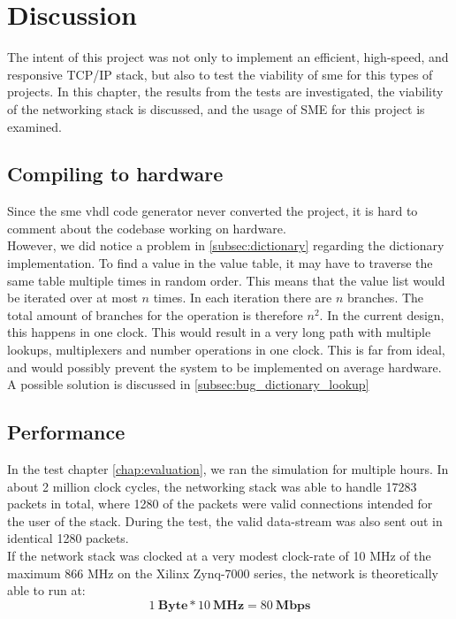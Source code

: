 \chapter{Discussion}
\label{chap:discussion}
The intent of this project was not only to implement an efficient, high-speed,
and responsive TCP/IP stack, but also to test the viability of \gls{sme} for
this types of projects. In this chapter, the results from the tests are
investigated, the viability of the networking stack is discussed, and the usage
of SME for this project is examined.

\section{Compiling to hardware}\label{sec:compiling_to_hardware}
Since the \gls{sme} \gls{vhdl} code generator never converted the project, it is hard
to comment about the codebase working on hardware.\\
However, we did notice a problem in \autoref{subsec:dictionary} regarding
the dictionary implementation. To find a value in the value table, it may have
to traverse the same table multiple times in random order. This means that the
value list would be iterated over at most $n$ times. In each iteration there are
$n$ branches. The total amount of branches for the operation is therefore $n^2$.
In the current design, this happens in one clock. This would result in a very
long path with multiple lookups, multiplexers and number operations in one clock.
This is far from ideal, and would possibly prevent the system to be implemented
on average hardware.\\
A possible solution is discussed in \autoref{subsec:bug_dictionary_lookup}


\section{Performance}
In the test chapter \ref{chap:evaluation}, we ran the simulation for
multiple hours. In about 2 million clock cycles, the networking stack was able
to handle 17283 packets in total, where 1280 of the packets were valid
connections intended for the user of the stack. During the test, the valid
data-stream was also sent out in identical 1280 packets.\\ %
If the network stack was clocked at a very modest clock-rate of 10 MHz of the
maximum 866 MHz on the Xilinx Zynq-7000 series\cite{xilinx_zynq_7000}, the
network is theoretically able to run at:
$$1\:\mathbf{Byte}*10\:\mathbf{MHz}= 80\:\mathbf{Mbps}$$


